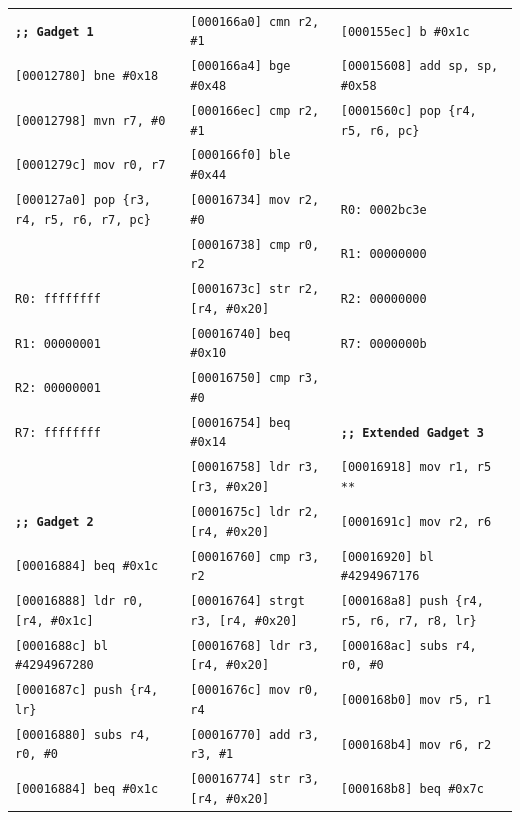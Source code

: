 \documentclass[9pt]{beamer}
\begin{document}
\begin{frame}{}
\begin{center}
{\begin{tabular}{l l l}
        \textbf{\texttt{;; Gadget 1}} 		& \texttt{[000166a0]  cmn r2, \#1}		& \texttt{[000155ec]  b \#0x1c} \\
        \texttt{[00012780]  bne \#0x18}	& \texttt{[000166a4]  bge \#0x48}			& \texttt{[00015608]  add sp, sp, \#0x58} \\
        \texttt{[00012798]  mvn r7, \#0}	& \texttt{[000166ec]  cmp r2, \#1}			& \texttt{[0001560c]  pop \{r4, r5, r6, pc\}} \\
        \texttt{[0001279c]  mov r0, r7}	& \texttt{[000166f0]  ble \#0x44}			& \\
        \texttt{[000127a0]  pop \{r3, r4, r5, r6, r7, pc\}} & \texttt{[00016734]  mov r2, \#0} & \texttt{R0: 0002bc3e} \\
 				& \texttt{[00016738]  cmp r0, r2}			& \texttt{R1: 00000000} \\
        \texttt{R0: ffffffff}			& \texttt{[0001673c]  str r2, [r4, \#0x20]}		& \texttt{R2: 00000000} \\
        \texttt{R1: 00000001}		& \texttt{[00016740]  beq \#0x10}			& \texttt{R7: 0000000b} \\
        \texttt{R2: 00000001}		& \texttt{[00016750]  cmp r3, \#0}			& \\
        \texttt{R7: ffffffff}			& \texttt{[00016754]  beq \#0x14}			& \textbf{\texttt{;; Extended Gadget 3}} \\
 					& \texttt{[00016758]  ldr r3, [r3, \#0x20]}	& \texttt{[00016918]  mov r1, r5   **}\\
        \textbf{\texttt{;; Gadget 2}}		& \texttt{[0001675c]  ldr r2, [r4, \#0x20]}		& \texttt{[0001691c]  mov r2, r6} \\
        \texttt{[00016884]  beq \#0x1c}	& \texttt{[00016760]  cmp r3, r2}			& \texttt{[00016920]  bl \#4294967176} \\
        \texttt{[00016888]  ldr r0, [r4, \#0x1c]} & \texttt{[00016764]  strgt r3, [r4, \#0x20]} & \texttt{[000168a8]  push \{r4, r5, r6, r7, r8, lr\}} \\
        \texttt{[0001688c]  bl \#4294967280} & \texttt{[00016768]  ldr r3, [r4, \#0x20]}	& \texttt{[000168ac]  subs r4, r0, \#0} \\
        \texttt{[0001687c]  push \{r4, lr\}}	& \texttt{[0001676c]  mov r0, r4}		& \texttt{[000168b0]  mov r5, r1} \\
        \texttt{[00016880]  subs r4, r0, \#0} & \texttt{[00016770]  add r3, r3, \#1}		& \texttt{[000168b4]  mov r6, r2} \\
        \texttt{[00016884]  beq \#0x1c}	& \texttt{[00016774]  str r3, [r4, \#0x20]}		& \texttt{[000168b8]  beq \#0x7c} \\

\end{tabular}}
\end{center}
\end{frame}
\end{document}
